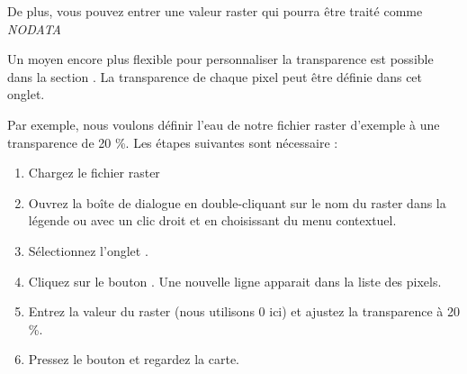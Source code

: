 De plus, vous pouvez entrer une valeur raster qui pourra \^etre trait\'e comme {\em
NODATA}

Un moyen encore plus flexible pour personnaliser la transparence est possible
dans la section .
La transparence de chaque pixel peut \^etre d\'efinie dans cet onglet.

Par exemple, nous voulons d\'efinir l'eau de notre fichier raster d'exemple
 \`a une transparence de 20 \%. Les \'etapes suivantes sont
n\'ecessaire :
\begin{enumerate}
\item Chargez le fichier raster 
 \item Ouvrez la bo\^ite de dialogue  en double-cliquant sur
le nom du raster dans la l\'egende ou avec un clic droit et en choisissant
 du menu contextuel.
 \item S\'electionnez l'onglet .
  \item \label{enum:add} Cliquez sur le bouton
. Une
nouvelle ligne apparait dans la liste des pixels.
 \item \label{enum:transp} Entrez la valeur du raster (nous utilisons 0 ici)
et ajustez la transparence \`a 20 \%.
 \item Pressez le bouton  et regardez la carte.
\end{enumerate}

